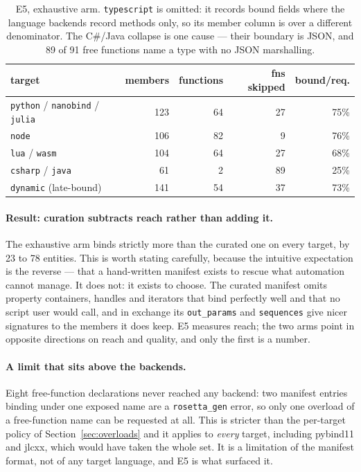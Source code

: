 \documentclass[11pt,a4paper]{article}
\newcommand{\code}[1]{\texttt{\small #1}}
\begin{document}
\begin{table}[h]
\centering\small
\begin{tabular}{lrrrr}
\toprule
target & members & functions & fns skipped & bound/req. \\
\midrule
\code{python} / \code{nanobind} / \code{julia} & 123 & 64 & 27 & 75\% \\
\code{node}       & 106 & 82 & 9  & 76\% \\
\code{lua} / \code{wasm} & 104 & 64 & 27 & 68\% \\
\code{csharp} / \code{java} & 61 & 2 & 89 & 25\% \\
\code{dynamic} (late-bound) & 141 & 54 & 37 & 73\% \\
\bottomrule
\end{tabular}
\caption{E5, exhaustive arm. \code{typescript} is omitted: it records bound
fields where the language backends record methods only, so its member column is
over a different denominator. The C\#/Java collapse is one cause --- their
boundary is JSON, and 89 of 91 free functions name a type with no JSON
marshalling.}
\label{tab:e5}
\end{table}

\paragraph{Result: curation subtracts reach rather than adding it.} The
exhaustive arm binds strictly more than the curated one on every target, by 23
to 78 entities. This is worth stating carefully, because the intuitive
expectation is the reverse --- that a hand-written manifest exists to rescue
what automation cannot manage. It does not: it exists to choose. The curated
manifest omits property containers, handles and iterators that bind perfectly
well and that no script user would call, and in exchange its \code{out\_params}
and \code{sequences} give nicer signatures to the members it does keep. E5
measures reach; the two arms point in opposite directions on reach and quality,
and only the first is a number.

\paragraph{A limit that sits above the backends.} Eight free-function
declarations never reached any backend: two manifest entries binding under one
exposed name are a \code{rosetta\_gen} error, so only one overload of a
free-function name can be requested at all. This is stricter than the per-target
policy of Section~\ref{sec:overloads} and it applies to \emph{every} target,
including pybind11 and jlcxx, which would have taken the whole set. It is a
limitation of the manifest format, not of any target language, and E5 is what
surfaced it.
\end{document}
